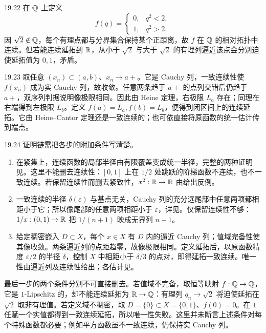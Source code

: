 \begin{solution}{19.22}
在 \(\mathbb{Q}\) 上定义
\[
 f(q)=
 \begin{cases}
 0,&q^2<2,\\
 1,&q^2>2.
 \end{cases}
\]
因 \(\sqrt2\notin\mathbb{Q}\)，每个有理点都与分界集合保持某个正距离，故 \(f\) 在 \(\mathbb{Q}\) 的相对拓扑中连续。但若能连续延拓到 \(\mathbb{R}\)，从小于 \(\sqrt2\) 与大于 \(\sqrt2\) 的有理列逼近该点会分别迫使延拓值为 \(0,1\)，矛盾。
\end{solution}

\begin{solution}{19.23}
取任意 \((x_n)\subset(a,b)\)、\(x_n\to a+\)。它是 Cauchy 列，一致连续性使 \(f(x_n)\) 成为实 Cauchy 列，故收敛。任意两条趋于 \(a+\) 的点列交错后仍趋于 \(a+\)，双序列判据说明像极限相同。因此由 Heine 定理，右极限 \(L_a\) 存在；同理在右端得到左极限 \(L_b\)。定义 \(f(a)=L_a,f(b)=L_b\)，便得到闭区间上的连续延拓。它由 Heine--Cantor 定理还是一致连续的；也可依直接将原函数的统一估计传到端点。
\end{solution}

\begin{solution}{19.24}
证明链需把各步的附加条件写清楚。
\begin{enumerate}
 \item 在紧集上，连续函数的局部半径由有限覆盖变成统一半径，完整的两种证明见。这里不能删去连续性：\([0,1]\) 上在 \(1/2\) 处跳跃的阶梯函数不连续，也不一致连续。若保留连续性而删去紧致性，\(x^2:\mathbb{R}\to\mathbb{R}\) 由给出反例。
 \item 一致连续的半径 \(\delta(\varepsilon)\) 与基点无关，Cauchy 列的充分远尾部中任意两项都相距小于它；所以像尾部的任意两项相距小于 \(\varepsilon\)，详见。仅保留连续性不够：\(1/x:(0,1)\to\mathbb{R}\) 把 \(1/(n+1)\) 映成无界列 \(n+1\)。
 \item 给定稠密嵌入 \(D\subset X\)，每个 \(x\in X\) 有 \(D\) 内的逼近 Cauchy 列；值域完备性使其像收敛。两条逼近列的点距趋零，故像极限相同。定义延拓后，以原函数精度 \(\varepsilon/2\) 的半径 \(\delta\)，控制 \(X\) 中相距小于 \(\delta/3\) 的点对，即得延拓一致连续。唯一性由逼近列及连续性给出；各估计见。
\end{enumerate}
最后一步的两个条件分别不可直接删去。若值域不完备，取恒等映射 \(f:\mathbb{Q}\to\mathbb{Q}\)，它是 \(1\)-Lipschitz 的，却不能连续延拓为 \(\mathbb{R}\to\mathbb{Q}\)：有理列 \(q_n\to\sqrt2\) 将迫使延拓在 \(\sqrt2\) 取非有理值。若定义域不稠密，取 \(D=\{0\}\subset X=\{0,1\}\)、\(f(0)=0\)。在 \(1\) 任赋一个实值都得到一致连续延拓，所以唯一性失败。这里并未断言上述条件对每个特殊函数都必要；例如平方函数虽不一致连续，仍保持实 Cauchy 列。
\end{solution}

